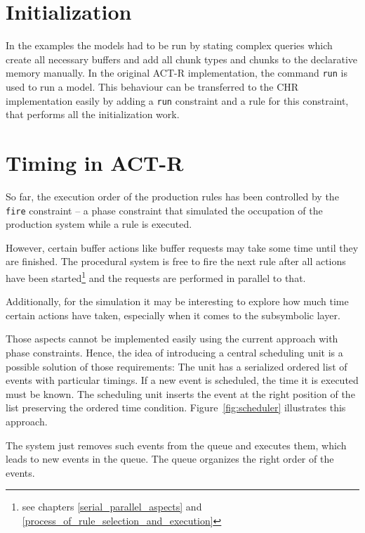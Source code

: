 \section{Initialization}
\label{initialization}

In the examples the models had to be run by stating complex queries which create all necessary buffers and add all chunk types and chunks to the declarative memory manually. In the original ACT-R implementation, the command \verb|run| is used to run a model. This behaviour can be transferred to the CHR implementation easily by adding a \verb|run| constraint and a rule for this constraint, that performs all the initialization work.


\section{Timing in ACT-R}

So far, the execution order of the production rules has been controlled by the \verb|fire| constraint -- a phase constraint that simulated the occupation of the production system while a rule is executed.

However, certain buffer actions like buffer requests may take some time until they are finished. The procedural system is free to fire the next rule after all actions have been started\footnote{see chapters \ref{serial_parallel_aspects} and \ref{process_of_rule_selection_and_execution}} and the requests are performed in parallel to that.

Additionally, for the simulation it may be interesting to explore how much time certain actions have taken, especially when it comes to the subsymbolic layer.

Those aspects cannot be implemented easily using the current approach with phase constraints. Hence, the idea of introducing a central scheduling unit is a possible solution of those requirements: The unit has a serialized ordered list of events with particular timings. If a new event is scheduled, the time it is executed must be known. The scheduling unit inserts the event at the right position of the list preserving the ordered time condition. Figure~\ref{fig:scheduler} illustrates this approach.

The system just removes such events from the queue and executes them, which leads to new events in the queue. The queue organizes the right order of the events.

